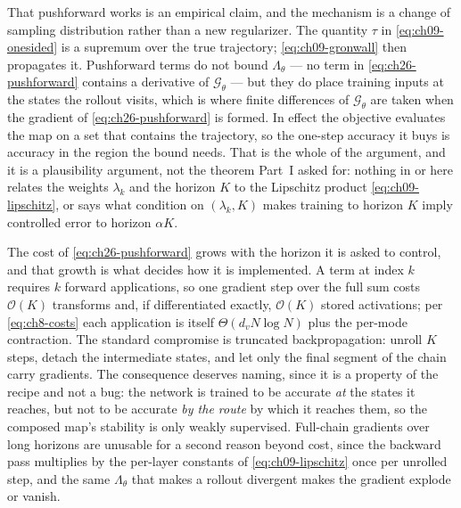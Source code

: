 That pushforward works is an empirical claim, and the mechanism is a change of sampling distribution rather than a new
regularizer. The quantity $\tau$ in
\eqref{eq:ch09-onesided} is a supremum over the true trajectory;
\eqref{eq:ch09-gronwall} then propagates it. Pushforward terms do not bound
$\Lambda_\theta$ --- no term in \eqref{eq:ch26-pushforward} contains a derivative of
$\mathcal{G}_\theta$ --- but they do place training inputs at the states the rollout
visits, which is where finite differences of $\mathcal{G}_\theta$ are taken when the
gradient of \eqref{eq:ch26-pushforward} is formed. In effect the objective evaluates the map
on a set that contains the trajectory, so the one-step accuracy it buys is accuracy in the
region the bound needs. That is the whole of the argument, and it is a plausibility
argument, not the theorem Part~I asked for: nothing in
 or here relates the weights
$\lambda_k$ and the horizon $K$ to the Lipschitz product \eqref{eq:ch09-lipschitz}, or says
what condition on $(\lambda_k, K)$ makes training to horizon $K$ imply controlled error to
horizon $\alpha K$. 

The cost of \eqref{eq:ch26-pushforward} grows with the horizon it is asked to control, and
that growth is what decides how it is implemented. A term at index $k$ requires $k$ forward
applications, so one gradient step over the
full sum costs $\mathcal{O}(K)$ transforms and, if differentiated exactly, $\mathcal{O}(K)$
stored activations; per \eqref{eq:ch8-costs} each application is itself
$\Theta(d_v N\log N)$ plus the per-mode contraction. The standard compromise is truncated
backpropagation: unroll $K$ steps, detach the intermediate states, and let only the final
segment of the chain carry gradients. The consequence deserves naming, since it is a
property of the recipe and not a bug: the network is trained to be accurate \emph{at} the
states it reaches, but not to be accurate \emph{by the route} by which it reaches them, so
the composed map's stability is only weakly supervised. Full-chain gradients over long
horizons are unusable for a second reason beyond cost, since the backward pass multiplies by
the per-layer constants of \eqref{eq:ch09-lipschitz} once per unrolled step, and the same
$\Lambda_\theta$ that makes a rollout divergent makes the gradient explode or vanish.

